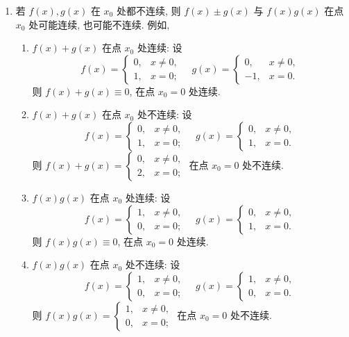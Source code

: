 \begin{solution}
\begin{enumerate}
        \item 若 $f(x), g(x)$ 在 $x_0$ 处都不连续, 则 $f(x) \pm g(x)$ 与 $f(x)g(x)$ 在点 $x_0$ 处可能连续, 也可能不连续. 例如,
              \begin{enumerate}
                  \item $f(x) + g(x)$ 在点 $x_0$ 处连续: 设
                        $$ f(x) = \begin{cases} 0, & x \ne
              0,         \\ 1, & x=0;\end{cases} \quad g(x) = \begin{cases} 0, & x \ne 0, \\ -1, & x=0. \end{cases} $$
                        则 $f(x)+g(x) \equiv 0$, 在点 $x_0=0$ 处连续.
                  \item $f(x) + g(x)$ 在点 $x_0$ 处不连续: 设
                        $$ f(x) = \begin{cases} 0, & x \ne 0, \\ 1, & x=0; \end{cases} \quad g(x) = \begin{cases} 0, & x \ne 0, \\ 1, & x=0. \end{cases} $$
                        则 $f(x)+g(x) = \begin{cases} 0, & x \ne 0, \\ 2, & x=0; \end{cases}$ 在点 $x_0=0$ 处不连续.
                  \item $f(x)g(x)$ 在点 $x_0$ 处连续: 设
                        $$ f(x) = \begin{cases} 1, & x \ne 0, \\ 0, & x=0; \end{cases} \quad g(x) = \begin{cases} 0, & x \ne 0, \\ 1, & x=0. \end{cases} $$
                        则 $f(x)g(x) \equiv 0$, 在点 $x_0=0$ 处连续.
                  \item $f(x)g(x)$ 在点 $x_0$ 处不连续: 设
                        $$ f(x) = \begin{cases} 1, & x \ne 0, \\ 0, & x=0; \end{cases} \quad g(x) = \begin{cases} 1, & x \ne 0, \\ 0, & x=0. \end{cases} $$
                        则 $f(x)g(x) = \begin{cases} 1, & x \ne 0, \\ 0, & x=0; \end{cases}$ 在点 $x_0=0$ 处不连续.
              \end{enumerate}
    \end{enumerate}
\end{solution}

